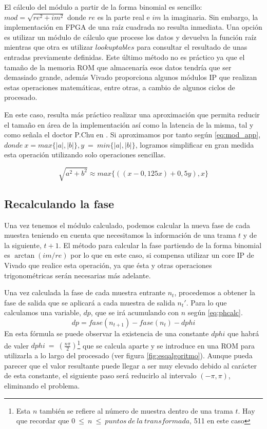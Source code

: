 El cálculo del módulo a partir de la forma binomial es sencillo: $mod = \sqrt{re^{2}+im^{2}}$ donde $re$ es la parte real e $im$ la imaginaria. Sin embargo, la implementación en FPGA de una raíz cuadrada no resulta inmediata. Una opción es utilizar un módulo de cálculo que procese los datos y devuelva la función raíz mientras que otra es utilizar $lookup tables$ para consultar el resultado de unas entradas previamente definidas. Este último método no es práctico ya que el tamaño de la memoria ROM que almacenaría esos datos tendría que ser demasiado grande, además Vivado proporciona algunos módulos IP que realizan estas operaciones matemáticas, entre otras, a cambio de algunos ciclos de procesado.

En este caso, resulta más práctico realizar una aproximación que permita reducir el tamaño en área de la implementación así como la latencia de la misma, tal y como señala el doctor P.Chu en \cite{vhdlchu}. Si aproximamos por tanto según \ref{eq:mod_app}, $donde~x = max\{|a|,|b|\}, y~=~min\{|a|,|b|\}$, logramos simplificar en gran medida esta operación utilizando solo operaciones sencillas.

\begin{equation}
\label{eq:mod_app}
 \sqrt{a^{2}+b^{2}} \approx max\{((x - 0,125x) + 0,5y),x\}
\end{equation} 

\subsection{Recalculando la fase\label{calc_alg}}
Una vez tenemos el módulo calculado, podemos calcular la nueva fase de cada muestra teniendo en cuenta que necesitamos la información de una trama $t$ y de la siguiente, $t+1$. El método para calcular la fase partiendo de la forma binomial es $\arctan(im/re)$ por lo que en este caso, si compensa utilizar un core IP de Vivado que realice esta operación, ya que ésta y otras operaciones trigonométricas serán necesarias más adelante.

Una vez calculada la fase de cada muestra entrante $n_{t}$, procedemos a obtener la fase de salida que se aplicará a cada muestra de salida $n_{t}'$. Para lo que calculamos una variable, $dp$, que se irá acumulando con $n$ según \ref{eq:phcalc}. 
\begin{equation}
\label{eq:phcalc}
dp = fase(n_{t+1}) - fase(n_{t}) - dphi
\end{equation} 
En esta fórmula se puede observar la existencia de una constante $dphi$ que habrá de valer $dphi~=~(\frac{n\pi}{2})$\footnote{Esta $n$ también se refiere al número de muestra dentro de una trama $t$. Hay que recordar que $0~\leq~n~\leq~puntos~de~la~transformada$, 511 en este caso} que se calcula aparte y se introduce en una ROM para utilizarla a lo largo del procesado (ver figura \ref{fig:esqalgoritmo}). Aunque pueda parecer que el valor resultante puede llegar a ser muy elevado debido al carácter de esta constante, el siguiente paso será reducirlo al intervalo $(-\pi,\pi)$, eliminando el problema.


